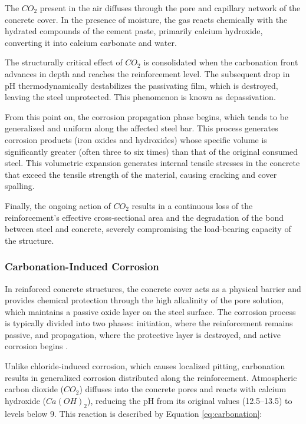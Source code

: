 The $CO_2$ present in the air diffuses through the pore and capillary network of the concrete cover. In the presence of moisture, the gas reacts chemically with the hydrated compounds of the cement paste, primarily calcium hydroxide, converting it into calcium carbonate and water.

The structurally critical effect of $CO_2$ is consolidated when the carbonation front advances in depth and reaches the reinforcement level. The subsequent drop in pH thermodynamically destabilizes the passivating film, which is destroyed, leaving the steel unprotected. This phenomenon is known as depassivation.

From this point on, the corrosion propagation phase begins, which tends to be generalized and uniform along the affected steel bar. This process generates corrosion products (iron oxides and hydroxides) whose specific volume is significantly greater (often three to six times) than that of the original consumed steel. This volumetric expansion generates internal tensile stresses in the concrete that exceed the tensile strength of the material, causing cracking and cover spalling.

Finally, the ongoing action of $CO_2$ results in a continuous loss of the reinforcement's effective cross-sectional area and the degradation of the bond between steel and concrete, severely compromising the load-bearing capacity of the structure.

\subsubsection{Carbonation-Induced Corrosion}

In reinforced concrete structures, the concrete cover acts as a physical barrier and provides chemical protection through the high alkalinity of the pore solution, which maintains a passive oxide layer on the steel surface. The corrosion process is typically divided into two phases: initiation, where the reinforcement remains passive, and propagation, where the protective layer is destroyed, and active corrosion begins \cite{cavaco_reliabilitybased_2017}.

Unlike chloride-induced corrosion, which causes localized pitting, carbonation results in generalized corrosion distributed along the reinforcement. Atmospheric carbon dioxide ($CO_2$) diffuses into the concrete pores and reacts with calcium hydroxide ($Ca(OH)_2$), reducing the pH from its original values (12.5--13.5) to levels below 9. This reaction is described by Equation \eqref{eq:carbonation}:


